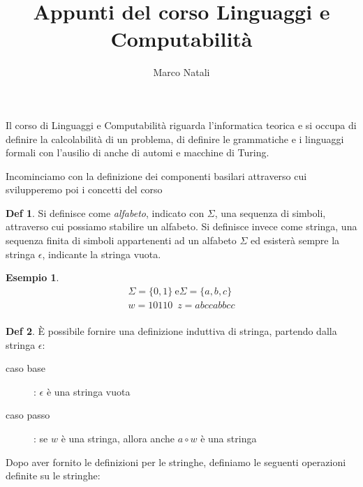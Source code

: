 \documentclass[a4paper]{book}
\theoremstyle{definition}%
\newtheorem*{defi}{Def}%
\newtheorem*{esempio}{Esempio}
\begin{document}
\title{Appunti del corso Linguaggi e Computabilità}
\author{Marco Natali}
\date{}
\maketitle

Il corso di Linguaggi e Computabilità riguarda l'informatica teorica e si occupa di definire la calcolabilità di un problema,
di definire le grammatiche e i linguaggi formali con l'ausilio di anche di automi e macchine di Turing.

Incominciamo con la definizione dei componenti basilari attraverso cui svilupperemo poi i concetti del corso
\begin{defi}
  Si definisce come \emph{alfabeto}, indicato con $\Sigma$, una sequenza di simboli, attraverso cui possiamo stabilire un alfabeto.\newline
  Si definisce invece come stringa, una sequenza finita di simboli appartenenti ad un alfabeto $\Sigma$ ed esisterà sempre la stringa $\epsilon$,
  indicante la stringa vuota.
\end{defi}
\begin{esempio}
  \[
  \begin{aligned}
    \Sigma = \{0, 1\}\ \text{e} \Sigma = \{a, b, c\} \\
    w = 10110 \, \, \, z = abccabbcc \\
  \end{aligned}
  \]
\end{esempio}
\begin{defi}
È possibile fornire una definizione induttiva di stringa, partendo dalla stringa $\epsilon$:
    \begin{description}
      \item [caso base]: $\epsilon$ è una stringa vuota
      \item [caso passo]: se $w$ è una stringa, allora anche $a \circ w $ è una stringa
    \end{description}
\end{defi}
Dopo aver fornito le definizioni per le stringhe, definiamo le seguenti operazioni definite su le stringhe:
\end{document}
